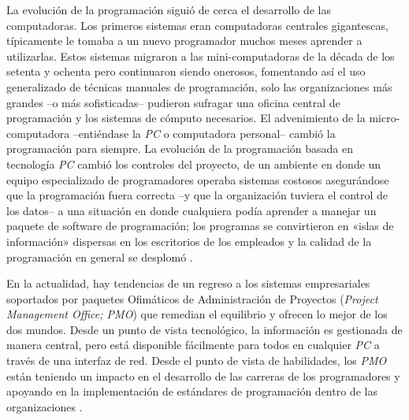 \documentclass[spanish,draft,12pt,headsepline,footsepline,paper=letter]{scrreprt}
\begin{document}
La evolución de la programación siguió de cerca el desarrollo de las computadoras. Los primeros sistemas eran computadoras centrales gigantescas, típicamente le tomaba a un nuevo programador muchos meses aprender a utilizarlas. Estos sistemas migraron a las mini-computadoras de la década de los setenta y ochenta pero continuaron siendo onerosos, fomentando así el uso generalizado de técnicas manuales de programación, solo las organizaciones más grandes –o más sofisticadas– pudieron sufragar una oficina central de programación y los sistemas de cómputo necesarios. 
%
El advenimiento de la micro-computadora –entiéndase la \textit{PC} o computadora personal– cambió la programación para siempre. La evolución de la programación basada en tecnología \textit{PC} cambió los controles del proyecto, de un ambiente en donde un equipo especializado de programadores operaba sistemas costosos asegurándose que la programación fuera correcta –y que la organización tuviera el control de los datos– a una situación en donde cualquiera podía aprender a manejar un paquete de software de programación; los programas se convirtieron en «islas de información» dispersas en los escritorios de los empleados y la calidad de la programación en general se desplomó \citep[p.~2]{Weaver2006}.

En la actualidad, hay tendencias de un regreso a los sistemas empresariales soportados por paquetes Ofimáticos de Administración de Proyectos (\textit{Project Management Office; PMO}) que remedian el equilibrio y ofrecen lo mejor de los dos mundos. Desde un punto de vista tecnológico, la información es gestionada de manera central, pero está disponible fácilmente para todos en cualquier \textit{PC} a través de una interfaz de red. Desde el punto de vista de habilidades, los \textit{PMO} están teniendo un impacto en el desarrollo de las carreras de los programadores y apoyando en la implementación de estándares de programación dentro de las organizaciones \citep[p.~2]{Weaver2006}.
\end{document}
